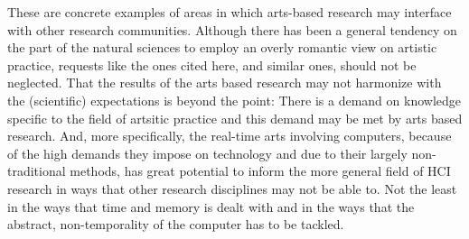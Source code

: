 These are concrete examples of areas in which arts-based research may interface with other research communities. Although there has been a general tendency on the part of the natural sciences to employ an overly romantic view on artistic practice, requests like the ones cited here, and similar ones, should not be neglected. That the results of the arts based research may not harmonize with the (scientific) expectations is beyond the point: There is a demand on knowledge specific to the field of artsitic practice and this demand may be met by arts based research. And, more specifically, the real-time arts involving computers, because of the high demands they impose on technology and due to their largely non-traditional methods, has great potential to inform the  more general field of HCI research in ways that other research disciplines may not be able to. Not the least in the ways that time and memory is dealt with and in the ways that the abstract, non-temporality of the computer has to be tackled. 












